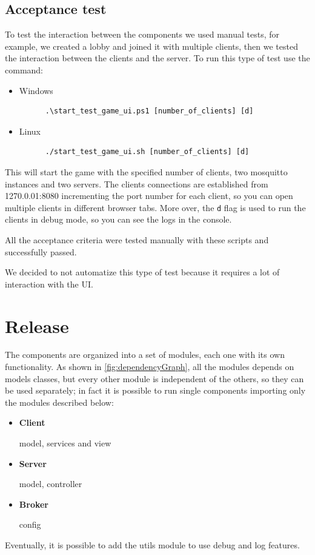 \documentclass{scrartcl}
\begin{document}
\subsection{Acceptance test}\label{acceptance-test}
To test the interaction between the components we used manual tests, for example, we created a 
lobby and joined it with multiple clients, then we tested the interaction between the clients and 
the server.
To run this type of test use the command:
\begin{itemize}
      \item Windows
            \begin{verbatim}
      .\start_test_game_ui.ps1 [number_of_clients] [d]
            \end{verbatim}
      \item Linux
            \begin{verbatim}
      ./start_test_game_ui.sh [number_of_clients] [d]
            \end{verbatim}
\end{itemize}
This will start the game with the specified number of clients, two mosquitto instances and two servers.
The clients connections are established from 1270.0.01:8080 incrementing the port number for each 
client, so you can  open multiple clients in different browser tabs. More over, the \texttt{d} flag
is used to run the clients in debug mode, so you can see the logs in the console.

All the acceptance criteria were tested manually with these scripts and successfully passed.

We decided to not automatize this type of test because it requires a lot of interaction with the UI.

\newpage
\section{Release}\label{release}
The components are organized into a set of modules, each one with its own functionality.
As shown in \cref{fig:dependencyGraph}, all the modules depends on models classes, but every other 
module is independent of the others, so they can be used separately; in fact it is possible to run 
single components importing only the modules described below:
\begin{itemize}
      \item \textbf{Client}\par
            model, services and view
      \item \textbf{Server}\par
            model, controller
      \item \textbf{Broker}\par
            config
\end{itemize}
Eventually, it is possible to add the utils module to use debug and log features.
\end{document}
